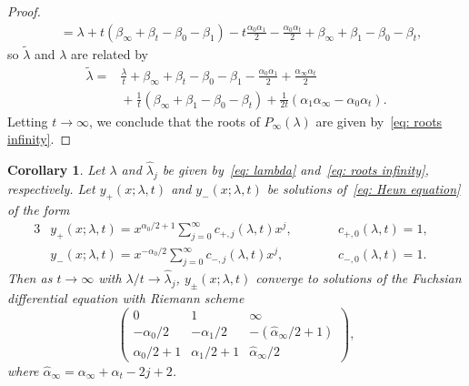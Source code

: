 \documentclass[10pt,a4paper]{amsart}
\numberwithin{equation}{section}
\newtheorem{Corollary}[Theorem]{Corollary}
\def\wt#1{\widetilde{#1}}
\begin{document}
\begin{proof}
\begin{align*}
 &{}=\lambda+t(\beta_\infty+\beta_t-\beta_0-\beta_1)-t\frac{\alpha_0\alpha_1}{2}
 -\frac{\alpha_0\alpha_t}{2}+\beta_\infty+\beta_1-\beta_0-\beta_t, \end{align*}
 so $\wt\lambda$ and $\lambda$ are related by
 {\allowdisplaybreaks
 \begin{align*}
 \wt\lambda={}&\frac\lambda t+\beta_\infty+\beta_t-\beta_0-\beta_1
 -\frac{\alpha_0\alpha_1}2+\frac{\alpha_\infty\alpha_t}2 \\
 &{}+\frac1t(\beta_\infty+\beta_1-\beta_0-\beta_t)
 +\frac1{2t}(\alpha_1\alpha_\infty-\alpha_0\alpha_t).
 \end{align*}
 }%
 Letting $t\to\infty$, we conclude that the roots of
 $P_\infty(\lambda)$ are given by~\eqref{eq: roots infinity}.
\end{proof}

\begin{Corollary}
 \label{corollary: limiting equations}
 Let $\lambda$ and $\hat\lambda_j$ be given by~\eqref{eq: lambda} and~\eqref{eq: roots infinity}, respectively.
 Let $y_+(x;\lambda,t)$ and $y_-(x;\lambda,t)$ be solutions of~\eqref{eq: Heun equation} of the form
\begin{alignat*}{3}
 & y_+(x;\lambda,t)=x^{\alpha_0/2+1}\sum_{j=0}^\infty
 c_{+,j}(\lambda,t)x^j, \qquad && c_{+,0}(\lambda,t)=1,&
\\
 & y_-(x;\lambda,t)=x^{-\alpha_0/2}\sum_{j=0}^\infty
 c_{-,j}(\lambda,t)x^j, \qquad && c_{-,0}(\lambda,t)=1.&
\end{alignat*}
 Then as $t\to\infty$ with $\lambda/t\to\hat\lambda_j$,
 $y_\pm(x;\lambda,t)$ converge to solutions of the Fuchsian
 differential equation with Riemann scheme
 \begin{equation} \label{eq: RS infinity}
 \begin{pmatrix}
 0 & 1 & \infty \\
 -\alpha_0/2 & -\alpha_1/2 & -(\hat\alpha_\infty/2+1) \\
 \alpha_0/2+1 & \alpha_1/2+1 & \hat\alpha_\infty/2
 \end{pmatrix},
 \end{equation}
 where $\hat\alpha_\infty=\alpha_\infty+\alpha_t-2j+2$.
\end{Corollary}
\end{document}
